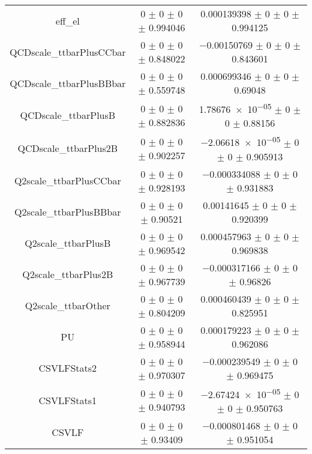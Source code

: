 \begin{table}
\begin{tabular}{ccc}
eff\_el & \num{0} $\pm$ \num{0} $\pm$ \num{0} $\pm$ \num{0.994046} & \num{0.000139398} $\pm$ \num{0} $\pm$ \num{0} $\pm$ \num{0.994125}\\
QCDscale\_ttbarPlusCCbar & \num{0} $\pm$ \num{0} $\pm$ \num{0} $\pm$ \num{0.848022} & \num{-0.00150769} $\pm$ \num{0} $\pm$ \num{0} $\pm$ \num{0.843601}\\
QCDscale\_ttbarPlusBBbar & \num{0} $\pm$ \num{0} $\pm$ \num{0} $\pm$ \num{0.559748} & \num{0.000699346} $\pm$ \num{0} $\pm$ \num{0} $\pm$ \num{0.69048}\\
QCDscale\_ttbarPlusB & \num{0} $\pm$ \num{0} $\pm$ \num{0} $\pm$ \num{0.882836} & \num{1.78676e-05} $\pm$ \num{0} $\pm$ \num{0} $\pm$ \num{0.88156}\\
QCDscale\_ttbarPlus2B & \num{0} $\pm$ \num{0} $\pm$ \num{0} $\pm$ \num{0.902257} & \num{-2.06618e-05} $\pm$ \num{0} $\pm$ \num{0} $\pm$ \num{0.905913}\\
Q2scale\_ttbarPlusCCbar & \num{0} $\pm$ \num{0} $\pm$ \num{0} $\pm$ \num{0.928193} & \num{-0.000334088} $\pm$ \num{0} $\pm$ \num{0} $\pm$ \num{0.931883}\\
Q2scale\_ttbarPlusBBbar & \num{0} $\pm$ \num{0} $\pm$ \num{0} $\pm$ \num{0.90521} & \num{0.00141645} $\pm$ \num{0} $\pm$ \num{0} $\pm$ \num{0.920399}\\
Q2scale\_ttbarPlusB & \num{0} $\pm$ \num{0} $\pm$ \num{0} $\pm$ \num{0.969542} & \num{0.000457963} $\pm$ \num{0} $\pm$ \num{0} $\pm$ \num{0.969838}\\
Q2scale\_ttbarPlus2B & \num{0} $\pm$ \num{0} $\pm$ \num{0} $\pm$ \num{0.967739} & \num{-0.000317166} $\pm$ \num{0} $\pm$ \num{0} $\pm$ \num{0.96826}\\
Q2scale\_ttbarOther & \num{0} $\pm$ \num{0} $\pm$ \num{0} $\pm$ \num{0.804209} & \num{0.000460439} $\pm$ \num{0} $\pm$ \num{0} $\pm$ \num{0.825951}\\
PU & \num{0} $\pm$ \num{0} $\pm$ \num{0} $\pm$ \num{0.958944} & \num{0.000179223} $\pm$ \num{0} $\pm$ \num{0} $\pm$ \num{0.962086}\\
CSVLFStats2 & \num{0} $\pm$ \num{0} $\pm$ \num{0} $\pm$ \num{0.970307} & \num{-0.000239549} $\pm$ \num{0} $\pm$ \num{0} $\pm$ \num{0.969475}\\
CSVLFStats1 & \num{0} $\pm$ \num{0} $\pm$ \num{0} $\pm$ \num{0.940793} & \num{-2.67424e-05} $\pm$ \num{0} $\pm$ \num{0} $\pm$ \num{0.950763}\\
CSVLF & \num{0} $\pm$ \num{0} $\pm$ \num{0} $\pm$ \num{0.93409} & \num{-0.000801468} $\pm$ \num{0} $\pm$ \num{0} $\pm$ \num{0.951054}\\

\end{tabular}
\end{table}
